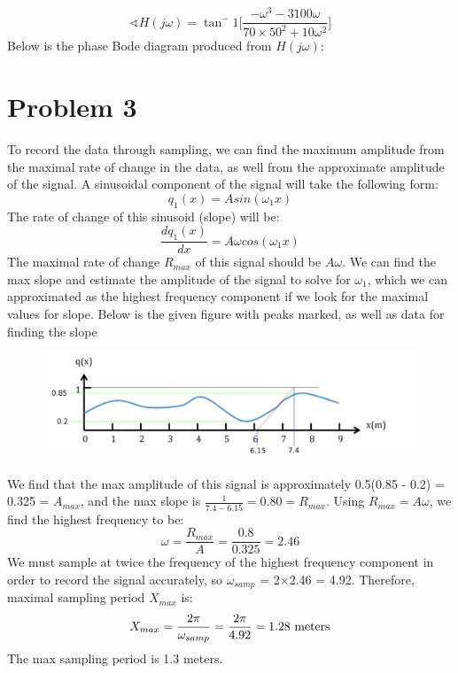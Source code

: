 \documentclass[12pt,letterpaper]{article}
\begin{document}
\begin{equation}
\sphericalangle H(j\omega)=\tan^-1\bigg[\frac{-\omega^3 - 3100 \omega}{70\times50^2+10\omega^2}\bigg]
\end{equation}
Below is the phase Bode diagram produced from $H(j\omega)$:
\FloatBarrier
\begin{figure}[h!]
\begin{center}
    	\resizebox{0.6\textwidth}{!}{}
\end{center}
\end{figure}
\pagebreak
\section{Problem 3}
To record the data through sampling, we can find the maximum amplitude from the maximal rate of change in the data, as well from the approximate amplitude of the signal. A sinusoidal component of the signal will take the following form:
\begin{equation}
q_1(x) = Asin(\omega_1 x)
\end{equation}
The rate of change of this sinusoid (slope) will be:
\begin{equation}
\frac{dq_1(x)}{dx} = A\omega cos(\omega_1 x)
\end{equation}
The maximal rate of change $R_{max}$ of this signal should be $A\omega$.  We can find the max slope and estimate the amplitude of the signal to solve for $\omega_1$, which we can approximated as the highest frequency component if we look for the maximal values for slope. Below is the given figure with peaks marked, as well as data for finding the slope
\begin{figure}[h!]
\begin{center}
 \includegraphics[scale=0.35]{./plots/3.png}
\end{center}
\end{figure}
\FloatBarrier
We find that the max amplitude of this signal is approximately 0.5(0.85 - 0.2) = 0.325 = $A_{max}$, and the max slope is $\frac{1}{7.4-6.15} =0.80 = R_{max}$. Using $R_{max} = A\omega$, we find the highest frequency to be:
\begin{equation}
\omega = \frac{R_{max}}{A} = \frac{0.8}{0.325} = 2.46
\end{equation}
We must sample at twice the frequency of the highest frequency component in order to record the signal accurately, so $\omega_{samp}$ = 2$\times$2.46 = 4.92. Therefore, maximal sampling period $X_{max}$ is:
\begin{equation}
X_{max} = \frac{2\pi}{\omega_{samp}}=\frac{2\pi}{4.92} = 1.28 \textnormal{ meters}
\end{equation}
The max sampling period is 1.3 meters.
\pagebreak
\end{document}
